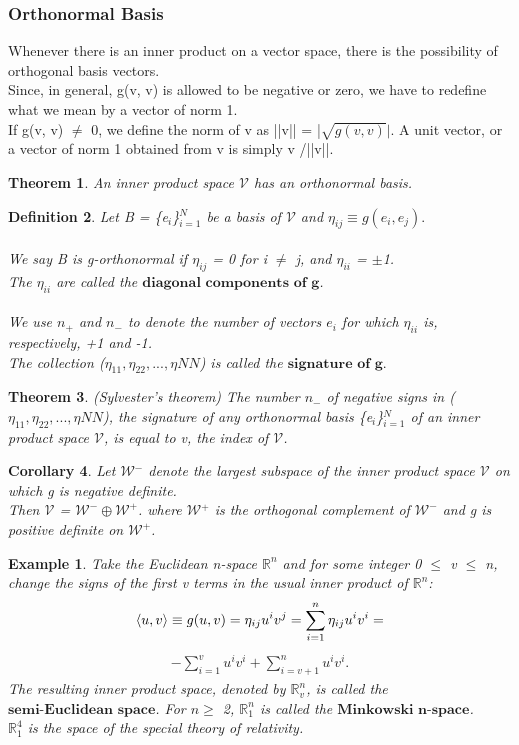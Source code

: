 \documentclass[12pt,a4paper]{article}
\newtheorem{thm}{Theorem}
\newtheorem{cor}[thm]{Corollary}
\newtheorem{defn}[thm]{Definition}
\newtheorem{exmp}{Example}[section]
\begin{document}
\subsubsection{Orthonormal Basis}
Whenever there is an inner product on a vector space, there is the possibility
of orthogonal basis vectors. \\Since, in general, g(v, v) is allowed to be negative or zero, we have to redefine what we mean by a vector of norm 1. \\If
g(v, v) $\ne$ 0, we define the norm of v as ||v|| = |$\sqrt{g(v,v)}|$. A unit vector, or
a vector of norm 1 obtained from v is simply v /||v||.
\begin{thm}
An inner product space $\mathcal{V}$ has an orthonormal basis.
\end{thm}
\begin{defn}
Let B = \{e$_i$\}$^N_{i=1}$ be a basis of $\mathcal{V}$ and $\eta_{ij} \equiv g(e_i, e_j).$ \\\\
We say B is g-orthonormal if $\eta_{ij}$ = 0 for i $\ne$ j, and $\eta_{ii}$ = $\pm$1. \\The $\eta_{ii}$ are called the $\textbf{diagonal components of g}$.\\\\
We use $n_+$ and $n_-$ to denote
the number of vectors $e_i$ for which $\eta_{ii}$ is, respectively, +1 and -1.\\ The collection ($\eta_{11}, \eta_{22},..., \eta{NN}$) is called the $\textbf{signature of g}.$
\end{defn}
\begin{thm}
(Sylvester's theorem)
The number $n_-$ of negative signs in ($\eta_{11}, \eta_{22},..., \eta{NN}$), the signature of any orthonormal basis \{e$_i$\}$^N_{i=1}$ of an inner product space $\mathcal{V}$, is equal to v, the index of $\mathcal{V}$.
\end{thm}
\begin{cor}
Let $\mathcal{W}$$^-$ denote the largest subspace of the inner product
space $\mathcal{V}$ on which g is negative definite. \\Then $\mathcal{V}$ = $\mathcal{W}^- \oplus \mathcal{W}^+$. where $\mathcal{W}$$^+$ is
the orthogonal complement of $\mathcal{W}^-$ and g is positive definite on $\mathcal{W}^+$.
\end{cor}
\begin{exmp}
Take the Euclidean n-space $\mathbb{R}^n$ and for some integer 0 $\leq$ v $\leq$ n, change
the signs of the first v terms in the usual inner product of $\mathbb{R}^n$:
\begin{align*}
\braket{u, v} \equiv g(u,v) = \eta_{ij} u^i v^j = \sum^n_{i=1} \eta_{ij} u^i v^i=
\end{align*}
\begin{align*}
-\sum^v_{i=1} u^i v^i + \sum^n_{i=v+1} u^i v^i. 
\end{align*} 
The resulting inner product space, denoted by $\mathbb{R}^n_v$, is called the $\textbf{semi-Euclidean space}$. For $n \geq$ 2, $\mathbb{R}^n_1$ is called the $\textbf{Minkowski n-space}$.\\$\mathbb{R}^4_1$ is the space of the special theory of relativity.
\end{exmp}
\end{document}
